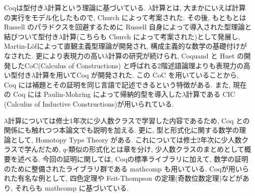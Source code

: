 \documentclass[11pt]{jsarticle}
\theoremstyle{mystyle}
\newcommand{\0}{\textbf{0}}
\begin{document}
Coqは型付き$\lambda$計算という理論に基づいている. $\lambda$計算とは, 大まかにいえば計算の実行をモデル化したもので, Church によって考案された. その後, もともとは Russell のパラドクスを回避するために Russell 自身によって導入された型理論と結びついて型付き$\lambda$計算(こちらも Church によって考案された)として発展し, Martin-L\"{o}fによって直観主義型理論が開発され, 構成主義的な数学の基礎付けがなされた. 更により表現力の高い$\lambda$計算の研究が続けられ, Coquand と Huet の開発したCoC(Calculus of Constructions) と呼ばれる2階述語論理よりも表現力の高い型付き$\lambda$計算を用いてCoq が開発された. この CoC を用いていることから, Coq には補題とその証明を同じ言語で記述できるという特徴がある. また, 現在の Coq には Paulin-Mohring によって帰納的型を導入した$\lambda$計算である CIC (Calculus of Inductive Constructions)が用いられている. 

$\lambda$計算については修士1年次に少人数クラスで学習した内容であるため, Coq との関係にも触れつつ本論文でも説明を加える. 更に, 型と形式化に関する数学の理論として, Homotopy Type Theory がある. これについては修士2年次に少人数クラスで学んだため, $q$-類似の形式化とは章を分け, 少人数クラスのまとめとして概要を述べる. 
今回の証明に関しては, Coqの標準ライブラリに加えて, 数学の証明のために整備されたライブラリ群である mathcomp も用いている. 
Coqが用いられた有名な例として, 四色定理や Feit-Thompson の定理(奇数位数定理)などがあり, それらも mathcomp に基づいている. 
\end{document}
